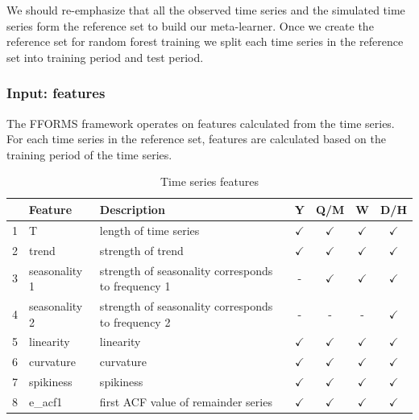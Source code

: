 \documentclass[11pt,a4paper,]{article}
\def\yes{$\checkmark$}
\begin{document}
We should re-emphasize that all the observed time series and the
simulated time series form the reference set to build our meta-learner.
Once we create the reference set for random forest training we split
each time series in the reference set into training period and test
period.

\subsubsection{Input: features}\label{input-features}

The FFORMS framework operates on features calculated from the time
series. For each time series in the reference set, features are
calculated based on the training period of the time series.

\begin{table}[!htp]
\centering\footnotesize\tabcolsep=0.12cm
\caption{Time series features}
\label{feature}
\begin{tabular}{llp{}cccc}
\toprule
\multicolumn{2}{c}{Feature} & Description & Y & Q/M & W & D/H\\
\midrule
1  & T              & length of time series                                                                   & \yes  & \yes & \yes & \yes\\
2  & trend          & strength of trend                                                                       & \yes  & \yes & \yes & \yes\\
3  & seasonality 1    & strength of seasonality corresponds to frequency 1                                                              & -     & \yes & \yes & \yes\\
4  & seasonality 2    & strength of seasonality corresponds to frequency 2                                                              & -     & - & -& \yes\\
5  & linearity      & linearity                                                                               & \yes  & \yes & \yes & \yes\\
6  & curvature      & curvature                                                                               & \yes  & \yes & \yes & \yes\\
7  & spikiness      & spikiness                                                                               & \yes  & \yes & \yes & \yes\\
8  & e\_acf1        & first ACF value of remainder series                                                     & \yes  & \yes & \yes & \yes\\

\end{tabular}
\end{table}
\end{document}
